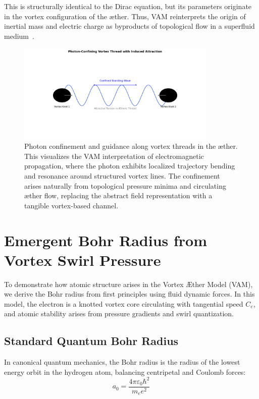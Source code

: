 This is structurally identical to the Dirac equation, but its parameters originate in the vortex configuration of the æther. Thus, VAM reinterprets the origin of inertial mass and electric charge as byproducts of topological flow in a superfluid medium~\cite{Barcelo2011,volovik2003}.

\begin{figure}[H]
    \centering
    \includegraphics[width=0.85\textwidth]{images/08-Photon-ConfiningVortexThreadGravitation}
    \caption{Photon confinement and guidance along vortex threads in the æther. This visualizes the VAM interpretation of electromagnetic propagation, where the photon exhibits localized trajectory bending and resonance around structured vortex lines. The confinement arises naturally from topological pressure minima and circulating æther flow, replacing the abstract field representation with a tangible vortex-based channel.}
    \label{fig:photon_confine}
\end{figure}

\section{Emergent Bohr Radius from Vortex Swirl Pressure}

To demonstrate how atomic structure arises in the Vortex \AE ther Model (VAM), we derive the Bohr radius from first principles using fluid dynamic forces. In this model, the electron is a knotted vortex core circulating with tangential speed $C_e$, and atomic stability arises from pressure gradients and swirl quantization.

\subsection*{Standard Quantum Bohr Radius}

In canonical quantum mechanics, the Bohr radius is the radius of the lowest energy orbit in the hydrogen atom, balancing centripetal and Coulomb forces:
\begin{equation}
    a_0 = \frac{4\pi \varepsilon_0 \hbar^2}{m_e e^2}
\end{equation}


